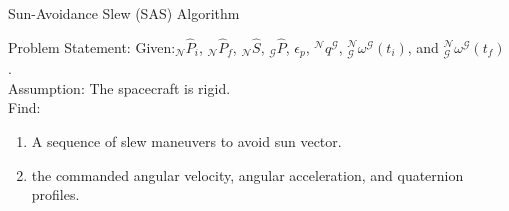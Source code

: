 \documentclass{beamer}
\begin{document}
\begin{frame}{Sun-Avoidance Slew (SAS) Algorithm}
	\begin{block}{Problem Statement:}
		Given:$_\mathcal{N}\hat{P}_i$, $_\mathcal{N}\hat{P}_f$, $_\mathcal{N}\hat{S}$, $_\mathcal{G}\hat{P}$, $\epsilon_p$, $^\mathcal{N}q^\mathcal{G}$, $^\mathcal{N}_\mathcal{G}\omega^\mathcal{G}(t_i)$, and $^\mathcal{N}_\mathcal{G}\omega^\mathcal{G}(t_f)$ .\\
		Assumption: The spacecraft is rigid.\\
		Find: 
		\begin{enumerate}
			\item A sequence of slew maneuvers to avoid sun vector.
			\item the commanded angular velocity, angular acceleration, and quaternion profiles.
		\end{enumerate} 
	\end{block}
\end{frame}
\end{document}
